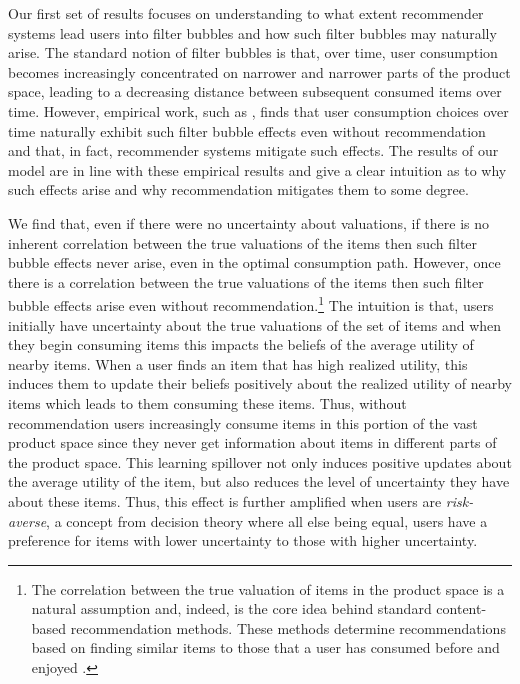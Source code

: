 \documentclass[format=acmsmall, review=false]{acmart}
\newcommand{\xhdr}[1]{\vspace{1mm} \noindent{\bf #1}}
\begin{document}
\xhdr{Main Findings}
Our first set of results focuses on understanding to what extent recommender systems lead users into filter bubbles and how such filter bubbles may naturally arise. The standard notion of filter bubbles is that, over time, user consumption becomes increasingly concentrated on narrower and narrower parts of the product space, leading to a decreasing distance between subsequent consumed items over time. However, empirical work, such as \cite{nguyen2014exploring}, finds that user consumption choices over time naturally exhibit such filter bubble effects even without recommendation and that, in fact, recommender systems mitigate such effects. The results of our model are in line with these empirical results and give a clear intuition as to why such effects arise and why recommendation mitigates them to some degree.
\par 
We find that, even if there were no uncertainty about valuations, if there is no inherent correlation between the true valuations of the items then such filter bubble effects never arise, even in the optimal consumption path. However, once there is a correlation between the true valuations of the items then such filter bubble effects arise even without recommendation.\footnote{The correlation between the true valuation of items in the product space is a natural assumption and, indeed, is the core idea behind standard content-based recommendation methods. These methods determine recommendations based on finding similar items to those that a user has consumed before and enjoyed \citep{adomavicius2005toward}.} The intuition is that, users initially have uncertainty about the true valuations of the set of items and when they begin consuming items this impacts the beliefs of the average utility of nearby items. When a user finds an item that has high realized utility, this induces them to update their beliefs positively about the realized utility of nearby items which leads to them consuming these items. Thus, without recommendation users increasingly consume items in this portion of the vast product space since they never get information about items in different parts of the product space. This learning spillover not only induces positive updates about the average utility of the item, but also reduces the level of uncertainty they have about these items. Thus, this effect is further amplified when users are \textit{risk-averse}, a concept from decision theory where all else being equal, users have a preference for items with lower uncertainty to those with higher uncertainty.
\par 
\end{document}
